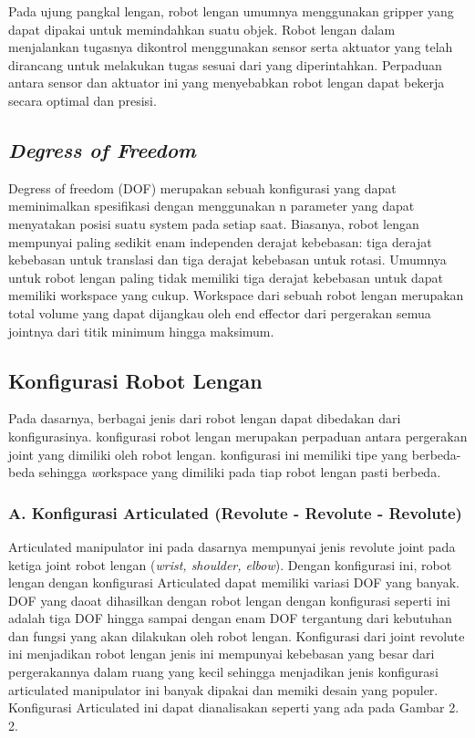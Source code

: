 Pada ujung pangkal lengan, robot lengan umumnya menggunakan gripper yang dapat dipakai untuk memindahkan suatu objek. Robot lengan dalam menjalankan tugasnya dikontrol menggunakan sensor serta aktuator yang telah dirancang untuk melakukan tugas sesuai dari yang diperintahkan. Perpaduan antara sensor dan aktuator ini yang menyebabkan robot lengan dapat bekerja secara optimal dan presisi.

\subsection{\emph{Degress of Freedom }}
Degress of freedom (DOF) merupakan sebuah konfigurasi yang dapat meminimalkan spesifikasi dengan menggunakan n parameter yang dapat menyatakan posisi suatu system pada setiap saat. Biasanya, robot lengan mempunyai paling sedikit enam independen derajat kebebasan: tiga derajat kebebasan untuk translasi dan tiga derajat kebebasan untuk rotasi. Umumnya untuk robot lengan paling tidak memiliki tiga derajat kebebasan untuk dapat memiliki workspace yang cukup. Workspace dari sebuah robot lengan merupakan total volume yang dapat dijangkau oleh end effector dari pergerakan semua jointnya dari titik minimum hingga maksimum. 

\subsection{Konfigurasi Robot Lengan}
Pada dasarnya, berbagai jenis dari robot lengan dapat dibedakan dari konfigurasinya. konfigurasi robot lengan merupakan perpaduan antara pergerakan joint yang dimiliki oleh robot lengan. konfigurasi ini memiliki tipe yang berbeda-beda sehingga \emph workspace yang dimiliki pada tiap robot lengan pasti berbeda.

\subsubsection{A. Konfigurasi Articulated (Revolute - Revolute - Revolute)} 
Articulated manipulator ini pada dasarnya mempunyai jenis revolute joint pada ketiga joint robot lengan (\emph {wrist, shoulder, elbow}). Dengan konfigurasi ini, robot lengan dengan konfigurasi Articulated dapat memiliki variasi DOF yang banyak. DOF yang daoat dihasilkan dengan robot lengan dengan konfigurasi seperti ini adalah tiga DOF hingga sampai dengan enam DOF tergantung dari kebutuhan dan fungsi yang akan dilakukan oleh robot lengan. Konfigurasi dari joint revolute ini menjadikan robot lengan jenis ini mempunyai kebebasan yang besar dari pergerakannya dalam ruang yang kecil sehingga menjadikan jenis konfigurasi articulated manipulator ini banyak dipakai dan memiki desain yang populer. Konfigurasi Articulated ini dapat dianalisakan seperti yang ada pada Gambar 2. 2.

